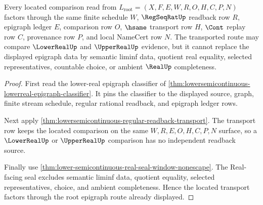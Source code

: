\begin{theorem}
\label{thm:lowersemicontinuous-root-epigraph-located-transport}
Every located comparison read from
$L_{\mathrm{root}}=(X,F,E,W,R,O,H,C,P,N)$ factors through the same finite
schedule $W$, $\RegSeqRatUp$ readback row $R$, epigraph ledger $E$, comparison
row $O$, $\hsame$ transport row $H$, $\Cont$ replay row $C$, provenance row
$P$, and local NameCert row $N$. The transported route may compare
$\LowerRealUp$ and $\UpperRealUp$ evidence, but it cannot replace the displayed
epigraph data by semantic liminf data, quotient real equality, selected
representatives, countable choice, or ambient $\RealUp$ completeness.
\end{theorem}
\begin{proof}
First read the lower-real epigraph classifier of
\autoref{thm:lowersemicontinuous-lowerreal-epigraph-classifier}. It pins the
classifier to the displayed source, graph, finite stream schedule, regular
rational readback, and epigraph ledger rows.

Next apply \autoref{thm:lowersemicontinuous-regular-readback-transport}. The
transport row keeps the located comparison on the same $W,R,E,O,H,C,P,N$
surface, so a $\LowerRealUp$ or $\UpperRealUp$ comparison has no independent
readback source.

Finally use \autoref{thm:lower-semicontinuous-real-seal-window-nonescape}. The
Real-facing seal excludes semantic liminf data, quotient equality, selected
representatives, choice, and ambient completeness. Hence the located
transport factors through the root epigraph route already displayed.
\end{proof}

